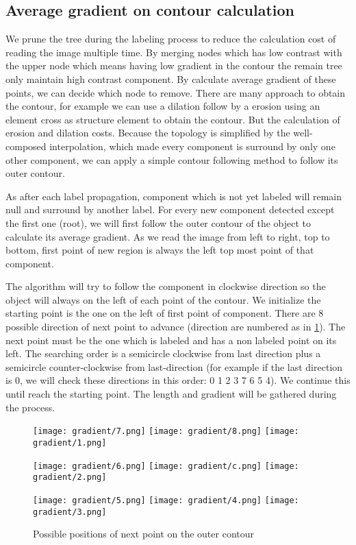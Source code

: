 \subsection{Average gradient on contour calculation} \label{subsec:ContourFollowing}
\par We prune the tree during the labeling process to reduce the calculation cost of reading the image multiple time. By merging nodes which has low contrast with the upper node which means having low gradient in the contour the remain tree only maintain high contrast component. By calculate average gradient of these points, we can decide which node to remove. There are many approach to obtain the contour, for example we can use a dilation follow by a erosion using an element cross as structure element to obtain the contour. But the calculation of erosion and dilation costs. Because the topology is simplified by the well-composed interpolation, which made every component is surround by only one other component, we can apply a simple contour following method to follow its outer contour.
\par As after each label propagation, component which is not yet labeled will remain null and surround by another label. For every new component detected except the first one (root), we will first follow the outer contour of the object to calculate its average gradient. As we read the image from left to right, top to bottom, first point of new region is always the left top most point of that component. 

The algorithm will try to follow the component in clockwise direction so the object will always on the left of each point of the contour. We initialize the starting point is the one on the left of first point of component. There are 8 possible direction of next point to advance (direction are numbered as in \ref{fig:directionToSearch}). The next point must be the one which is labeled and has a non labeled point on its left. The searching order is a semicircle clockwise from last direction plus a semicircle counter-clockwise from last-direction (for example if the last direction is 0, we will check these directions in this order: 0 1 2 3 7 6 5 4). We continue this until reach the starting point. The length and gradient will be gathered during the process. 

\begin{figure}
\texttt{[image: gradient/7.png]}
\texttt{[image: gradient/8.png]}
\texttt{[image: gradient/1.png]}
\centering

\texttt{[image: gradient/6.png]}
\texttt{[image: gradient/c.png]}
\texttt{[image: gradient/2.png]}
\centering

\texttt{[image: gradient/5.png]}
\texttt{[image: gradient/4.png]}
\texttt{[image: gradient/3.png]}
\centering
\caption{Possible positions of next point on the outer contour}
\label{fig:directionToSearch}
\end{figure}


